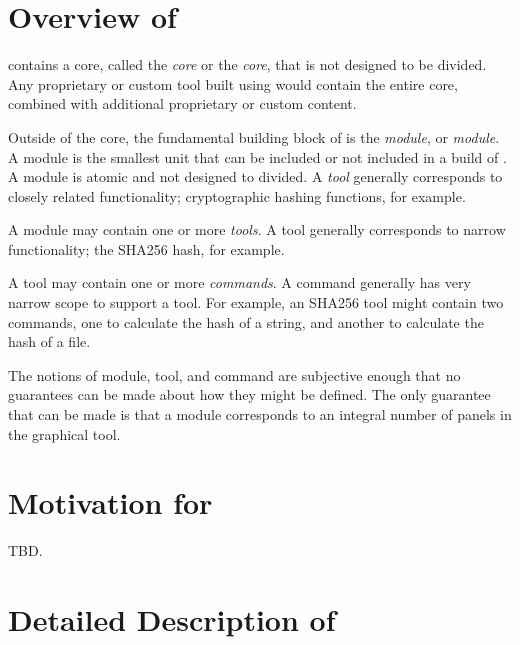 \section{Overview of \productname{}}
\label{cint2:siov1}

\emph{\productname{}} contains a core, called the \emph{core}
or the \emph{\productname{} core},
that is not designed to be divided.  Any proprietary or custom tool built
using \emph{\productname{}} would contain the entire core, combined
with additional proprietary or custom content.

Outside of the core, the fundamental building block of \emph{\productname{}}
is the \emph{\productname{} module}, or \emph{module}.  A module is the
smallest unit that can be included or not included in a build
of \emph{\productname{}}.  A module is atomic and not designed to
divided.  A \emph{tool} generally corresponds to closely related functionality;
cryptographic hashing functions, for example.

A module may contain one or more \emph{tools}.  A tool generally
corresponds to narrow functionality; the SHA256 hash, for example.

A tool may contain one or more \emph{commands}.  A command
generally has very narrow scope to support a tool.  For example,
an SHA256 tool might contain two commands, one to calculate the
hash of a string, and another to calculate the hash of a file.

The notions of module, tool, and command are subjective enough
that no guarantees can be made about how they might be
defined.  The only guarantee that can be made is that a
module corresponds to an integral number of panels
in the graphical tool.


\section{Motivation for \emph{\productname{}}}
\label{cint2:smfp0}

TBD.


\section{Detailed Description of \emph{\productname{}}}
\label{cint2:sddp0}

